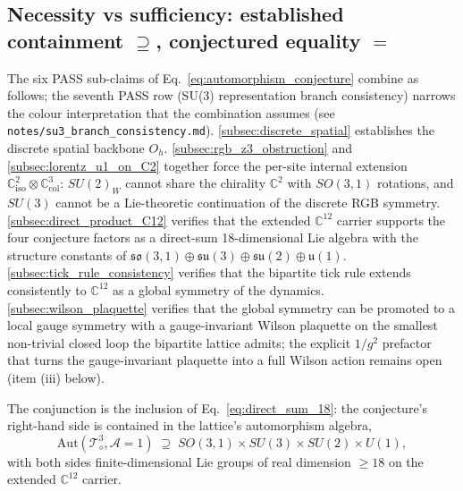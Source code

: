 \subsection{Necessity vs sufficiency: established containment $\supseteq$, conjectured equality $=$}
\label{subsec:established_necessity_vs_sufficiency}

The six PASS sub-claims of
Eq.~\eqref{eq:automorphism_conjecture} combine as follows; the
seventh PASS row (SU(3) representation branch consistency) narrows
the colour interpretation that the combination assumes (see
\nolinkurl{notes/su3_branch_consistency.md}).
\autoref{subsec:discrete_spatial} establishes the discrete spatial
backbone $O_h$.  \autoref{subsec:rgb_z3_obstruction} and
\autoref{subsec:lorentz_u1_on_C2} together force the per-site
internal extension $\mathbb{C}^2_\text{iso} \otimes
\mathbb{C}^3_\text{col}$: $SU(2)_W$ cannot share the chirality
$\mathbb{C}^2$ with $SO(3,1)$ rotations, and $SU(3)$ cannot be a
Lie-theoretic continuation of the discrete RGB symmetry.
\autoref{subsec:direct_product_C12} verifies that the extended
$\mathbb{C}^{12}$ carrier supports the four conjecture factors as
a direct-sum 18-dimensional Lie algebra with the structure
constants of $\mathfrak{so}(3,1) \oplus \mathfrak{su}(3) \oplus
\mathfrak{su}(2) \oplus \mathfrak{u}(1)$.
\autoref{subsec:tick_rule_consistency} verifies that the bipartite
tick rule extends consistently to $\mathbb{C}^{12}$ as a global
symmetry of the dynamics.  \autoref{subsec:wilson_plaquette}
verifies that the global symmetry can be promoted to a local gauge
symmetry with a gauge-invariant Wilson plaquette on the smallest
non-trivial closed loop the bipartite lattice admits; the explicit
$1/g^2$ prefactor that turns the gauge-invariant plaquette into a
full Wilson action remains open (item (iii) below).

The conjunction is the inclusion of
Eq.~\eqref{eq:direct_sum_18}: the conjecture's right-hand side is
contained in the lattice's automorphism algebra,
\begin{equation}
\label{eq:established_containment}
\mathrm{Aut}(\mathcal{T}_\diamond^3, \mathcal{A}=1)
\;\supseteq\;
SO(3,1) \times SU(3) \times SU(2) \times U(1),
\end{equation}
with both sides finite-dimensional Lie groups of real dimension
$\geq 18$ on the extended $\mathbb{C}^{12}$ carrier.

